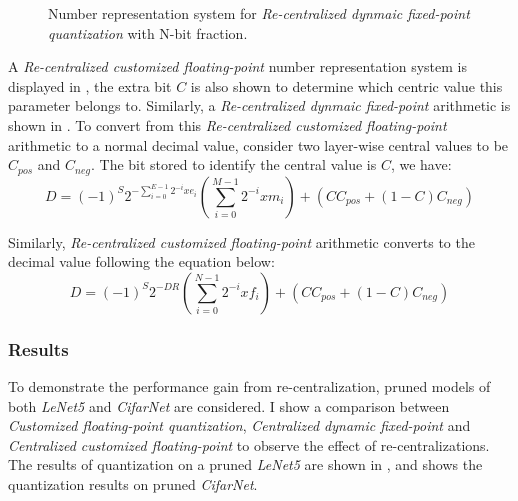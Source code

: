 \documentclass[a4paper,12pt]{report}
\begin{document}
\begin{figure}[!h]
\centering
{}
\caption{Number representation system for \textit{Re-centralized dynmaic fixed-point quantization} with
N-bit fraction.}
\label{fig:number_rep_cdfp}
\end{figure}

A \textit{Re-centralized customized floating-point} number representation system
is displayed in ,
the extra bit $C$ is also shown to determine which centric value this parameter
belongs to.
Similarly, a \textit{Re-centralized dynmaic fixed-point} arithmetic is shown in
.
To convert from this \textit{Re-centralized customized floating-point} arithmetic to a normal decimal value, consider two
layer-wise central values to be $C_{pos}$ and $C_{neg}$.
The bit stored to identify the central value is $C$, we have:
\begin{equation}
    D = (-1)^S 2^{-\sum^{E-1}_{i=0}2^{-i}xe_i}(\sum^{M-1}_{i=0}2^{-i}xm_i) + (C C_{pos} + (1-C)C_{neg})
    \label{equ:d2dfp}
\end{equation}

Similarly, \textit{Re-centralized customized floating-point} arithmetic converts
to the decimal value following the equation below:
\begin{equation}
    D = (-1)^S 2^{-DR}(\sum^{N-1}_{i=0}2^{-i}xf_i) + (C C_{pos} + (1-C)C_{neg})
    \label{equ:d2dfp}
\end{equation}



\subsubsection{Results}
To demonstrate the performance gain from re-centralization,
pruned models of both \textit{LeNet5} and \textit{CifarNet} are considered.
I show a comparison between
\textit{Customized floating-point quantization}, \textit{Centralized dynamic
fixed-point} and
\textit{Centralized customized floating-point} to observe the effect of
re-centralizations.
The results of quantization on a pruned \textit{LeNet5} are shown in
, and  shows the quantization
results on pruned \textit{CifarNet}.
\end{document}

